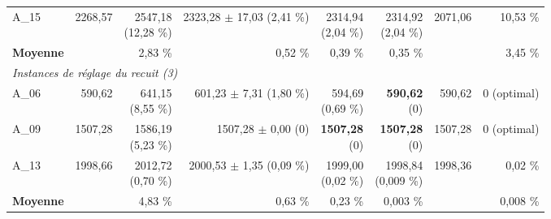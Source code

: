 \begin{tabular}{lrrrrrrr}
A\_15 & 2268,57 & \makecell{2547,18\\ \footnotesize(12,28 \%)} & \makecell{2323,28 $\pm$ 17,03\\ \footnotesize(2,41 \%)} & \makecell{2314,94\\ \footnotesize(2,04 \%)} & \makecell{2314,92\\ \footnotesize(2,04 \%)} & 2071,06 & 10,53 \% \\
\textbf{Moyenne} &  & 2,83 \% & 0,52 \% & 0,39 \% & 0,35 \% &  & 3,45 \% \\
\midrule
\multicolumn{8}{l}{\textit{Instances de réglage du recuit (3)}} \\
\midrule
A\_06 & 590,62 & \makecell{641,15\\ \footnotesize(8,55 \%)} & \makecell{601,23 $\pm$ 7,31\\ \footnotesize(1,80 \%)} & \makecell{594,69\\ \footnotesize(0,69 \%)} & \makecell{\textbf{590,62}\\ \footnotesize(0)} & 590,62 & 0 (optimal) \\
A\_09 & 1507,28 & \makecell{1586,19\\ \footnotesize(5,23 \%)} & \makecell{1507,28 $\pm$ 0,00\\ \footnotesize(0)} & \makecell{\textbf{1507,28}\\ \footnotesize(0)} & \makecell{\textbf{1507,28}\\ \footnotesize(0)} & 1507,28 & 0 (optimal) \\
A\_13 & 1998,66 & \makecell{2012,72\\ \footnotesize(0,70 \%)} & \makecell{2000,53 $\pm$ 1,35\\ \footnotesize(0,09 \%)} & \makecell{1999,00\\ \footnotesize(0,02 \%)} & \makecell{1998,84\\ \footnotesize(0,009 \%)} & 1998,36 & 0,02 \% \\
\textbf{Moyenne} &  & 4,83 \% & 0,63 \% & 0,23 \% & 0,003 \% &  & 0,008 \% \\
\bottomrule
\end{tabular}
